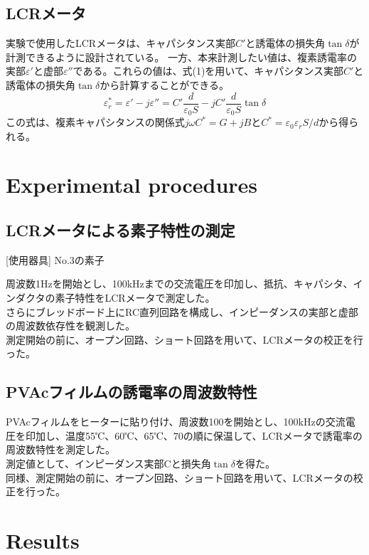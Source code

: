 \documentclass[a4paper,10pt]{jsarticle}
\begin{document}
\begin{multicols}{2}
\subsection{\textrm{LCRメータ}}
実験で使用したLCRメータは、キャパシタンス実部$C'$と誘電体の損失角$\tan\delta$が計測できるように設計されている。
一方、本来計測したい値は、複素誘電率の実部$ε'$と虚部$ε''$である。これらの値は、式(1)を用いて、キャパシタンス実部$C'$と誘電体の損失角$\tan\delta$から計算することができる。
\begin{equation}
  ε_r^*=ε'-jε''=C'\frac{d}{ε_0S}-jC'\frac{d}{ε_0S}\tan\delta
\end{equation}
この式は、複素キャパシタンスの関係式$j\omega C^*=G+jB$と$C^*=ε_0ε_rS/d$から得られる。

\section{\textrm{Experimental procedures}}
\subsection{\textrm{LCRメータによる素子特性の測定}}
[使用器具] No.3の素子

周波数1Hzを開始とし、100kHzまでの交流電圧を印加し、抵抗、キャパシタ、インダクタの素子特性をLCRメータで測定した。\\
さらにブレッドボード上にRC直列回路を構成し、インピーダンスの実部と虚部の周波数依存性を観測した。\\

測定開始の前に、オープン回路、ショート回路を用いて、LCRメータの校正を行った。\\
\subsection{\textrm{PVAcフィルムの誘電率の周波数特性}}
PVAcフィルムをヒーターに貼り付け、周波数100を開始とし、100kHzの交流電圧を印加し、温度55℃、60℃、65℃、70の順に保温して、LCRメータで誘電率の周波数特性を測定した。\\
測定値として、インピーダンス実部Cと損失角$\tan\delta$を得た。\\

同様、測定開始の前に、オープン回路、ショート回路を用いて、LCRメータの校正を行った。\\

\section{\textrm{Results}}

\end{multicols}
\end{document}

